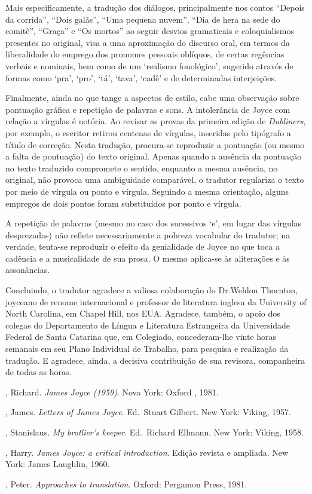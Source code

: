 Mais especificamente, a tradução dos diálogos, principalmente nos
contos ``Depois da corrida'', ``Dois galãs'', ``Uma pequena
nuvem'', ``Dia de hera na sede do comitê'', ``Graça'' e
``Os mortos'' ao seguir desvios gramaticais e coloquialismos
presentes no original, visa a uma aproximação do discurso oral, em
termos da liberalidade do emprego dos pronomes pessoais oblíquos, de
certas regências verbais e nominais, bem como de um `realismo
fonológico', sugerido através de formas como `pra', `pro',
`tá', `tava', `cadê' e de determinadas interjeições.

Finalmente, ainda no que tange a aspectos de estilo, cabe uma
observação sobre pontuação gráfica e repetição de palavras e sons. A
intolerância de Joyce com relação a vírgulas é notória. Ao revisar as
provas da primeira edição de \textit{Dubliners}, por exemplo, o escritor
retirou centenas de vírgulas, inseridas pelo tipógrafo a título de
correção. Nesta tradução, procura-se reproduzir a pontuação (ou
mesmo a falta de pontuação) do texto original. Apenas quando a
ausência da pontuação no texto traduzido compromete o sentido,
enquanto a mesma ausência, no original, não provoca uma ambiguidade
comparável, o tradutor regulariza o texto por meio de vírgula ou ponto
e vírgula. Seguindo a mesma orientação, alguns empregos de dois pontos
foram substituídos por ponto e vírgula.

A repetição de palavras (mesmo no caso dos sucessivos `e', em lugar
das vírgulas desprezadas) não reflete necessariamente a pobreza
vocabular do tradutor; na verdade, tenta-se reproduzir o efeito da
genialidade de Joyce no que toca a cadência e a musicalidade de sua
prosa. O mesmo aplica-se às aliterações e às assonâncias.

Concluindo, o tradutor agradece a valiosa colaboração do Dr.Weldon
Thornton, joyceano de renome internacional e professor de literatura
inglesa da University of North Carolina, em Chapel Hill, nos EUA.
Agradece, também, o apoio dos colegas do Departamento de Língua e
Literatura Estrangeira da Universidade Federal de Santa Catarina
que, em Colegiado, concederam-lhe
 vinte horas semanais em seu Plano Individual de Trabalho, para
pesquisa e realização da tradução. E agradece, ainda, a decisiva
contribuição de sua revisora, companheira de todas as horas.

\begin{bibliohedra}

, Richard. \textit{James Joyce (1959)}. Nova York: Oxford
, 1981.

, James. \textit{Letters of James Joyce}. Ed.~Stuart
Gilbert. New York: Viking, 1957.

, Stanislaus. \textit{My brotlier's keeper}. Ed.~Richard Ellmann.
New York: Viking, 1958.

, Harry. \textit{James Joyce: a critical introduction}. Edição revista e
ampliada. New York: James Laughlin, 1960.

, Peter. \textit{Approaches to translation}. Oxford: Pergamon Press,
1981.

\end{bibliohedra}


